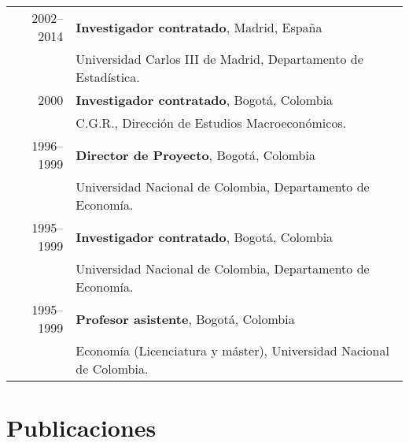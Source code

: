 \documentclass[11pt]{article}\usepackage[]{graphicx}\usepackage[]{color}
\begin{document}
\begin{tabular}{rl{-2cm}}

2002--2014 &  \textbf{Investigador contratado}, Madrid, España\\
& Universidad Carlos III de Madrid, Departamento de Estadística.\\

2000 & \textbf{Investigador contratado}, Bogotá, Colombia\\
& C.G.R., Dirección de Estudios Macroeconómicos.\\

1996--1999 & \textbf{Director de Proyecto}, Bogotá, Colombia\\
& Universidad Nacional de Colombia, Departamento de Economía.\\

1995--1999 & \textbf{Investigador contratado}, Bogotá, Colombia\\
& Universidad Nacional de Colombia, Departamento de Economía.}\\

1995--1999 & \textbf{Profesor asistente}, Bogotá, Colombia\\
& Economía (Licenciatura y máster), Universidad Nacional de Colombia.\\

\end{tabular}
\vspace{10pt}

\clearpage
\section{Publicaciones}
\end{document}
